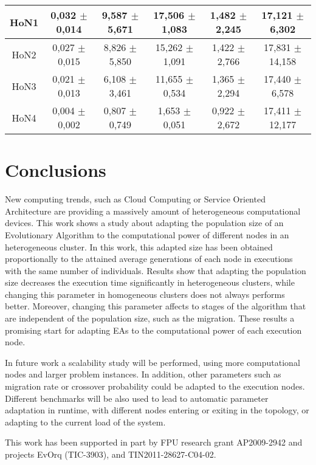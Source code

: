 \begin{table*}
\begin{tabular}{|c|c|c|c|c|c|}
HoN1	& 0,032	$\pm$ 0,014	& 9,587 $\pm$ 	5,671		& 17,506	$\pm$ 1,083		& 1,482	$\pm$ 2,245	&17,121  $\pm$ 	6,302 \\ \hline
HoN2	& 0,027	$\pm$ 0,015	& 8,826	$\pm$ 5,850			& 15,262	$\pm$ 1,091		& 1,422	$\pm$ 2,766	&17,831	 $\pm$ 14,158 \\ \hline
HoN3	& 0,021	$\pm$ 0,013	& 6,108	$\pm$ 3,461			& 11,655	$\pm$ 0,534		& 1,365	$\pm$ 2,294  &17,440  $\pm$ 	6,578 \\ \hline
HoN4	& 0,004	$\pm$ 0,002	& 0,807	$\pm$ 0,749			& 1,653		$\pm$ 0,051		& 0,922	$\pm$ 2,672	&17,411	 $\pm$ 12,177 \\ \hline
\end{tabular}
\label{tab:onemaxtimes}
\end{table*}

\section{Conclusions}
New computing trends, such as Cloud Computing or Service Oriented Architecture are providing a massively amount of heterogeneous computational devices. This work shows a study about adapting the population size of an Evolutionary Algorithm to the computational power of different nodes in an heterogeneous cluster. In this work, this adapted size has been obtained proportionally to the attained average generations of each node in executions with the same number of individuals. Results show that adapting the population size decreases the execution time significantly in heterogeneous clusters, while changing this parameter in homogeneous clusters does not always performs better. Moreover, changing this parameter affects to stages of the algorithm that are independent of the population size, such as the migration. These results a promising start for adapting EAs to the computational power of each execution node.

In future work a scalability study will be performed, using more computational nodes and larger problem instances. In addition, other parameters such as migration rate or crossover probability could be adapted to the execution nodes. Different benchmarks will be also used to lead to automatic parameter adaptation in runtime, with different nodes entering or exiting in the topology, or adapting to the current load of the system.



\begin{acknowledgements}
This work has been supported in part by FPU research grant AP2009-2942 and projects EvOrq (TIC-3903), and TIN2011-28627-C04-02.
\end{acknowledgements}

 







